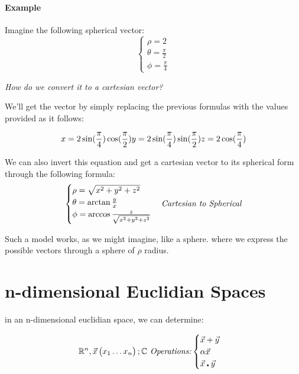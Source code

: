 \documentclass[11pt,fleqn]{book} %
\begin{document}
\paragraph{Example}
Imagine the following spherical vector:
$$
\begin{cases}
    \rho = 2 \\
    \theta = \frac{\pi}{2}\\
    \phi = \frac{\pi}{4}
\end{cases}
$$

\textit{How do we convert it to a cartesian vector?}

We'll get the vector by simply replacing the previous formulas with the 
values provided as it follows:

\begin{equation}
    x = 2 \sin(\frac{\pi}{4}) \cos(\frac{\pi}{2}) \\
    y = 2 \sin(\frac{\pi}{4}) \sin(\frac{\pi}{2}) \\
    z = 2 \cos(\frac{\pi}{4})
\end{equation}

We can also invert this equation and get a cartesian vector to its spherical form
through the following formula:
\begin{gather}
    \begin{cases}
        \rho = \sqrt{x^2 + y^2 + z^2} \\
        \theta = \arctan{\frac{y}{x}} \\
        \phi = \arccos{\frac{z}{\sqrt{x^2 + y^2 + z^2}}}
    \end{cases}
    \text{\textit{Cartesian to Spherical}}
\end{gather}

Such a model works, as we might imagine, like a sphere. where we express the possible vectors
through a sphere of $ \rho $ radius.

\section{n-dimensional Euclidian Spaces}

in an n-dimensional euclidian space, we can determine:

\begin{equation}
    \mathbb{R}^n, \vec{x} \begin{pmatrix}
        x_1
        \dots
        x_n
    \end{pmatrix}
    ; \mathbb{C}
    \text{\textit{ Operations:}}
    \begin{cases}
        \vec{x}+\vec{y} \\
        \alpha \vec{x} \\
        \vec{x} \centerdot \vec{y} \\
    \end{cases}
\end{equation}
\end{document}
